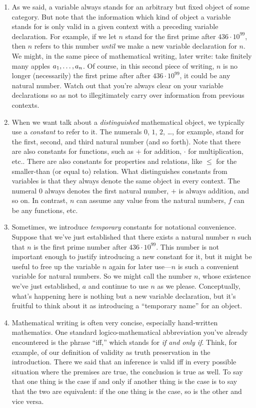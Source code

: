 \begin{enumerate}[{\thesection}.1]
		\item As we said, a variable always stands for an arbitrary but fixed object of some category. But note that the information which kind of object a variable stands for is only valid in a given context with a preceding variable declaration. For example, if we let $n$ stand for the first prime after  $436\cdot 10^{99}$, then $n$ refers to this number \emph{until} we make a new variable declaration for $n$. We might, in the same piece of mathematical writing, later write: take finitely many apples $a_1, \mathellipsis, a_n$. Of course, in this second piece of writing, $n$ is no longer (necessarily) the first prime after after $436\cdot 10^{99}$, it could be any natural number. Watch out that you're always clear on your variable declarations so as not to illegitimately carry over information from previous contexts.
		
		\item When we want talk about a \emph{distinguished} mathematical object, we typically use a \emph{constant} to refer to it. The numerals $0$, $1$, $2$, \dots, for example, stand for the first, second, and third natural number (and so forth). Note that there are also constants for functions, such as $+$ for addition, $\cdot$ for multiplication, etc.. There are also constants for properties and relations, like $\leq$ for the smaller-than (or equal to) relation. What distinguishes constants from variables is that they always denote the same object in every context. The numeral $0$ always denotes the first natural number, $+$ is always addition, and so on. In contrast, $n$ can assume any value from the natural numbers, $f$ can be any functions, etc. 
		
		\item Sometimes, we introduce \emph{temporary} constants for notational convenience. Suppose that we've just established that there exists a natural number $n$ such that $n$ is the first prime number after $436\cdot 10^{99}$. This number is not important enough to justify introducing a new constant for it, but it might be useful to free up the variable $n$ again for later use---$n$ is such a convenient variable for natural numbers. So we might call the number $n$, whose existence we've just established, $a$ and continue to use $n$ as we please. Conceptually, what's happening here is nothing but a new variable declaration, but it's fruitful to think about it as introducing a ``temporary name'' for an object. 
		
		\item Mathematical writing is often very concise, especially hand-written mathematics. One standard logico-mathematical abbreviation you've already encountered is the phrase ``iff,'' which stands for \emph{if and only if}. Think, for example, of our definition of validity as truth preservation in the introduction. There we said that an inference is valid iff in every possible situation where the premises are true, the conclusion is true as well. To say that one thing is the case if and only if another thing is the case is to say that the two are equivalent: if the one thing is the case, so is the other and vice versa. 


\end{enumerate}
